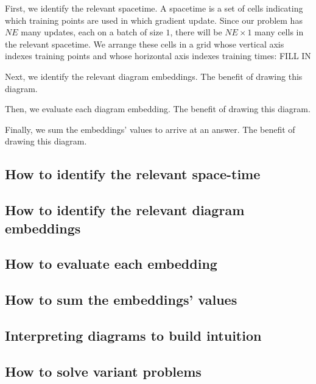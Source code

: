\documentclass{article}
\theoremstyle{plain}
\theoremstyle{definition}
\begin{document}
        First, we identify the relevant spacetime.  A spacetime is a set of
        cells indicating which training points are used in which gradient
        update.  Since our problem has $N E$ many updates, each on a
        batch of size $1$, there will be $N E\times 1$ many cells in the
        relevant spacetime.  We arrange these cells in a grid whose vertical
        axis indexes training points and whose horizontal axis indexes training 
        times:
        {\color{red} FILL IN}

        Next, we identify the relevant diagram embeddings.
        The benefit of drawing this diagram.  

        Then, we evaluate each diagram embedding.
        The benefit of drawing this diagram.  

        Finally, we sum the embeddings' values to arrive at an answer.
        The benefit of drawing this diagram.  

    \subsection{How to identify the relevant space-time}            %
    \subsection{How to identify the relevant diagram embeddings}    %
    \subsection{How to evaluate each embedding}                     %
    \subsection{How to sum the embeddings' values}                  %
    \subsection{Interpreting diagrams to build intuition}           %
    \subsection{How to solve variant problems}                      %
\end{document}
